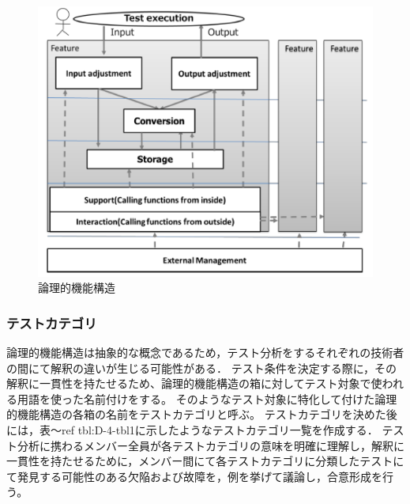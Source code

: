 \documentclass[a4paper,11pt]{jreport}
\begin{document}
\begin{figure}[h]
  \begin{center}
  \includegraphics[width=12cm]{./image/D-3-Fig3.png}
  \caption{論理的機能構造}
  \label{fig:D-4-Fig2}
  \end{center}
   \end{figure}

\subsubsection{テストカテゴリ}
論理的機能構造は抽象的な概念であるため，テスト分析をするそれぞれの技術者の間にて解釈の違いが生じる可能性がある． テスト条件を決定する際に，その解釈に一貫性を持たせるため、論理的機能構造の箱に対してテスト対象で使われる用語を使った名前付けをする。 そのようなテスト対象に特化して付けた論理的機能構造の各箱の名前をテストカテゴリと呼ぶ。 テストカテゴリを決めた後には，表〜ref {tbl:D-4-tbl1}に示したようなテストカテゴリ一覧を作成する． テスト分析に携わるメンバー全員が各テストカテゴリの意味を明確に理解し，解釈に一貫性を持たせるために，メンバー間にて各テストカテゴリに分類したテストにて発見する可能性のある欠陥および故障を，例を挙げて議論し，合意形成を行う。
\end{document}
